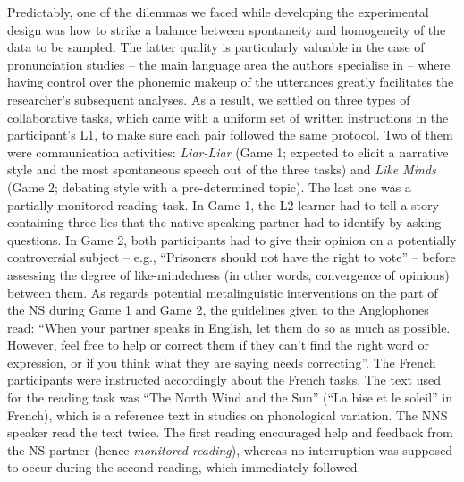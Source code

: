 \documentclass[12pt]{article}
\newenvironment{styleStandard}{\setlength\leftskip{0cm}\setlength\rightskip{0cm plus 1fil}\setlength\parindent{0cm}\setlength\parfillskip{0pt plus 1fil}\setlength\parskip{0cm plus 1pt}\writerlistparindent\writerlistleftskip\leavevmode\normalfont\normalsize\writerlistlabel\ignorespaces}{\unskip\vspace{0cm plus 1pt}\par}
\newcommand\writerlistleftskip{}
\newcommand\writerlistparindent{}
\newcommand\writerlistlabel{}
\begin{document}
\begin{styleStandard}
Predictably, one of the dilemmas we faced while developing the experimental design was how to strike a balance between spontaneity and homogeneity of the data to be sampled. The latter quality is particularly valuable in the case of pronunciation studies – the main language area the authors specialise in – where having control over the phonemic makeup of the utterances greatly facilitates the researcher’s subsequent analyses. As a result, we settled on three types of collaborative tasks, which came with a uniform set of written instructions in the participant’s L1, to make sure each pair followed the same protocol. Two of them were communication activities: \textit{Liar-Liar }(Game 1; expected to elicit a narrative style and the most spontaneous speech out of the three tasks) and \textit{Like Minds} (Game 2; debating style with a pre-determined topic). The last one was a partially monitored reading task. In Game 1, the L2 learner had to tell a story containing three lies that the native-speaking partner had to identify by asking questions. In Game 2, both participants had to give their opinion on a potentially controversial subject – e.g., “Prisoners should not have the right to vote” – before assessing the degree of like-mindedness (in other words, convergence of opinions) between them. As regards potential metalinguistic interventions on the part of the NS during Game 1 and Game 2, the guidelines given to the Anglophones read: “When your partner speaks in English, let them do so as much as possible. However, feel free to help or correct them if they can’t find the right word or expression, or if you think what they are saying needs correcting”. The French participants were instructed accordingly about the French tasks. The text used for the reading task was “The North Wind and the Sun” (“La bise et le soleil” in French), which is a reference text in studies on phonological variation. The NNS speaker read the text twice. The first reading encouraged help and feedback from the NS partner (hence \textit{monitored reading}), whereas no interruption was supposed to occur during the second reading, which immediately followed.
\end{styleStandard}
\end{document}
